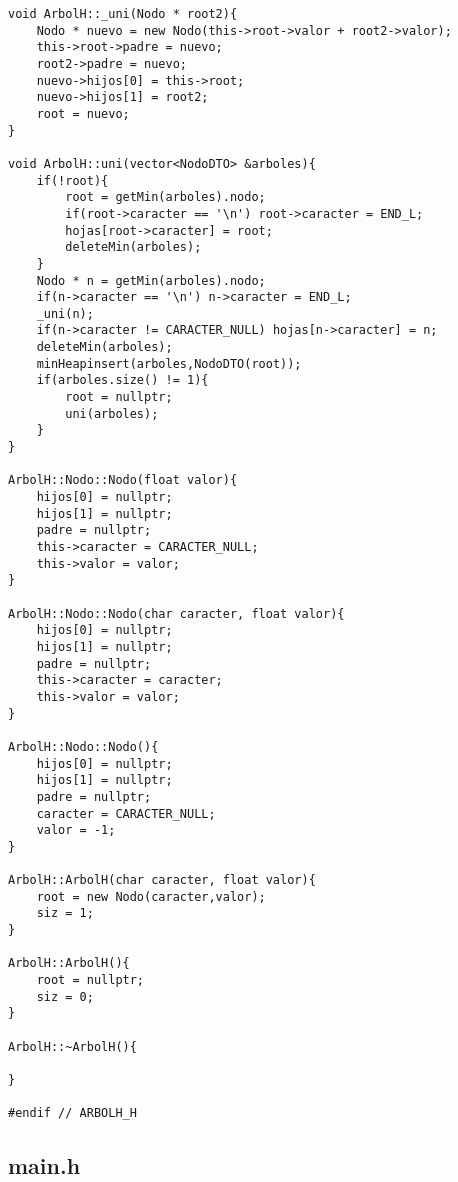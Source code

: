 \documentclass[a4paper,12pt]{article}
\begin{document}
\begin{lstlisting}
void ArbolH::_uni(Nodo * root2){
    Nodo * nuevo = new Nodo(this->root->valor + root2->valor);
    this->root->padre = nuevo;
    root2->padre = nuevo;
    nuevo->hijos[0] = this->root;
    nuevo->hijos[1] = root2;
    root = nuevo;
}

void ArbolH::uni(vector<NodoDTO> &arboles){
    if(!root){
        root = getMin(arboles).nodo;
        if(root->caracter == '\n') root->caracter = END_L;
        hojas[root->caracter] = root;
        deleteMin(arboles);
    }
    Nodo * n = getMin(arboles).nodo;
    if(n->caracter == '\n') n->caracter = END_L;
    _uni(n);
    if(n->caracter != CARACTER_NULL) hojas[n->caracter] = n;
    deleteMin(arboles);
    minHeapinsert(arboles,NodoDTO(root));
    if(arboles.size() != 1){
        root = nullptr;
        uni(arboles);
    }
}

ArbolH::Nodo::Nodo(float valor){
    hijos[0] = nullptr;
    hijos[1] = nullptr;
    padre = nullptr;
    this->caracter = CARACTER_NULL;
    this->valor = valor;
}

ArbolH::Nodo::Nodo(char caracter, float valor){
    hijos[0] = nullptr;
    hijos[1] = nullptr;
    padre = nullptr;
    this->caracter = caracter;
    this->valor = valor;
}

ArbolH::Nodo::Nodo(){
    hijos[0] = nullptr;
    hijos[1] = nullptr;
    padre = nullptr;
    caracter = CARACTER_NULL;
    valor = -1;
}

ArbolH::ArbolH(char caracter, float valor){
    root = new Nodo(caracter,valor);
    siz = 1;
}

ArbolH::ArbolH(){
    root = nullptr;
    siz = 0;
}

ArbolH::~ArbolH(){

}

#endif // ARBOLH_H

      \end{lstlisting}
    \subsection{main.h}
    
\end{document}
